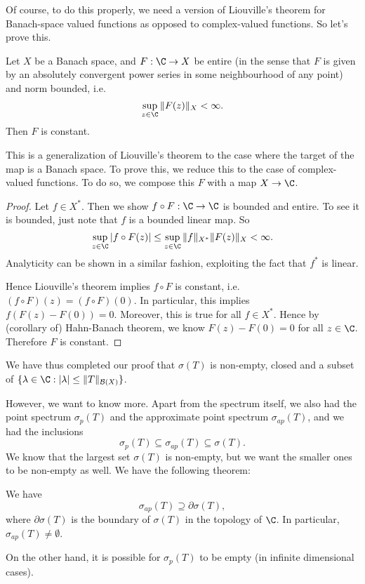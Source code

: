\documentclass[a4paper]{article}
\begin{document}
Of course, to do this properly, we need a version of Liouville's theorem for Banach-space valued functions as opposed to complex-valued functions. So let's prove this.

\begin{prop}
  Let $X$ be a Banach space, and $F: \C \to X$ be entire (in the sense that $F$ is given by an absolutely convergent power series in some neighbourhood of any point) and norm bounded, i.e.
  \[
    \sup_{z \in \C} \|F(z)\|_X < \infty.
  \]
  Then $F$ is constant.
\end{prop}
This is a generalization of Liouville's theorem to the case where the target of the map is a Banach space. To prove this, we reduce this to the case of complex-valued functions. To do so, we compose this $F$ with a map $X \to \C$.

\begin{proof}
  Let $f \in X^*$. Then we show $f \circ F: \C \to \C$ is bounded and entire. To see it is bounded, just note that $f$ is a bounded linear map. So
  \[
    \sup_{z \in \C} |f\circ F(z)| \leq \sup_{ z \in \C} \|f\|_{X^*} \|F(z)\|_X < \infty.
  \]
  Analyticity can be shown in a similar fashion, exploiting the fact that $f^*$ is linear.

  Hence Liouville's theorem implies $f \circ F$ is constant, i.e.\ $(f \circ F)(z) = (f\circ F)(0)$. In particular, this implies $f(F(z) - F(0)) = 0$. Moreover, this is true for all $f \in X^*$. Hence by (corollary of) Hahn-Banach theorem, we know $F(z) - F(0) = 0$ for all $z \in \C$. Therefore $F$ is constant.
\end{proof}
We have thus completed our proof that $\sigma(T)$ is non-empty, closed and a subset of $\{\lambda \in \C: |\lambda| \leq \|T\|_{\mathcal{B}(X)}\}$.

However, we want to know more. Apart from the spectrum itself, we also had the point spectrum $\sigma_p(T)$ and the approximate point spectrum $\sigma_{ap}(T)$, and we had the inclusions
\[
  \sigma_p(T) \subseteq \sigma_{ap}(T) \subseteq \sigma(T).
\]
We know that the largest set $\sigma(T)$ is non-empty, but we want the smaller ones to be non-empty as well. We have the following theorem:
\begin{thm}
  We have
  \[
    \sigma_{ap}(T) \supseteq \partial \sigma(T),
  \]
  where $\partial \sigma(T)$ is the boundary of $\sigma(T)$ in the topology of $\C$. In particular, $\sigma_{ap}(T) \not= \emptyset$.
\end{thm}
On the other hand, it is possible for $\sigma_p(T)$ to be empty (in infinite dimensional cases).
\end{document}
